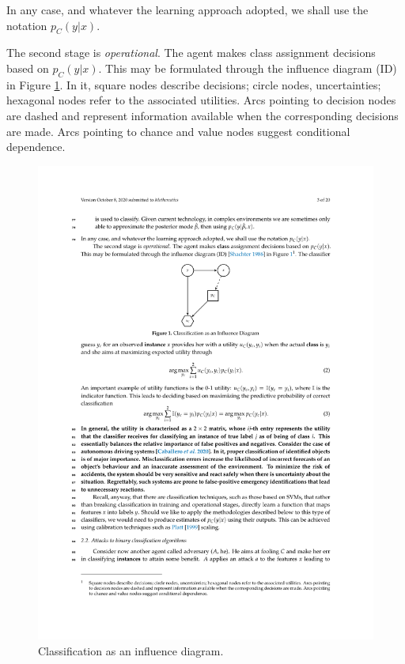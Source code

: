In any case, and whatever the learning approach adopted, we shall use the notation $p_C (y |x)$. 

The second stage is {\em operational}.
The agent makes class assignment decisions based on $p_C (y |x)$. %
This may be formulated through the influence diagram (ID)
\cite{evaluatingInfluenceDiagrams1986} in Figure \ref{fig:classification}. {In it, square nodes describe decisions; circle nodes, uncertainties; hexagonal nodes refer to the associated utilities. Arcs pointing to decision nodes are dashed and represent information available when the corresponding decisions are made. Arcs pointing to chance and value nodes suggest conditional dependence.}%
\begin{figure}[H]
\centering
\includegraphics[scale=1]{figures/1.pdf}
\caption{Classification as an influence diagram.} \label{fig:classification}
\end{figure}
